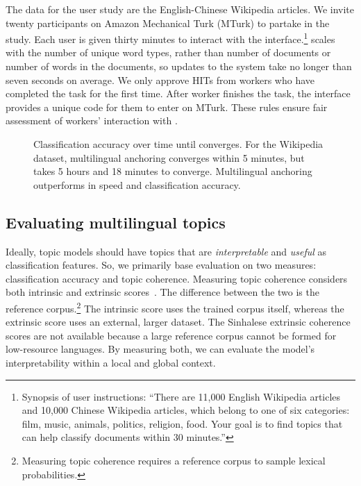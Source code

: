 The data for the \mtanchor user study are the English-Chinese Wikipedia articles.  We invite twenty participants on Amazon Mechanical Turk (MTurk) to partake in the study.  Each user is given thirty minutes to interact with the interface.\footnote{Synopsis of user instructions: ``There are 11,000 English Wikipedia articles and 10,000 Chinese Wikipedia articles, which belong to one of six categories: film, music, animals, politics, religion, food.  Your goal is to find topics that can help classify documents within 30 minutes.''}  \mtanchor scales with the number of unique word types, rather than number of documents or number of words in the documents, so updates to the system take no longer than seven seconds on average.  We only approve HITs from workers who have completed the task for the first time.  After worker finishes the task, the interface provides a unique code for them to enter on MTurk.  These rules ensure fair assessment of workers' interaction with \mtanchor.

\begin{figure}
  \centering
  \caption{Classification accuracy over time until  converges. For the Wikipedia dataset, multilingual anchoring converges within 5 minutes, but  takes 5 hours and 18 minutes to converge.  Multilingual anchoring outperforms  in speed and classification accuracy.}
  \label{fig:convergence}
\end{figure}


\subsection{Evaluating multilingual topics}

Ideally, topic models should have topics that are \emph{interpretable} and \emph{useful} as classification features.  So, we primarily base evaluation on two measures: classification accuracy and topic coherence.  Measuring topic coherence considers both intrinsic and extrinsic scores~\citep{lau-2014}.  The difference between the two is the reference corpus.\footnote{Measuring topic coherence requires a reference corpus to sample lexical probabilities.} The intrinsic score uses the trained corpus itself, whereas the extrinsic score uses an external, larger dataset.  The Sinhalese extrinsic coherence scores are not available because a large reference corpus cannot be formed for low-resource languages.  By measuring both, we can evaluate the model's interpretability within a local and global context.   

